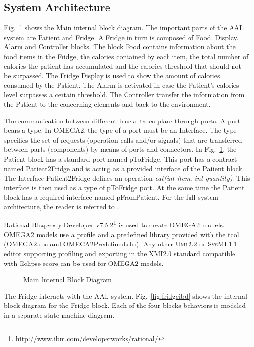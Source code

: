 \documentclass[a4paper,twoside]{article}
\def\sysml{\textsc{SysML}}
\def\uml{\textsc{Uml}}
\begin{document}
\subsection{System Architecture}
Fig.~\ref{fig:mainibd} shows the Main internal block diagram. The important parts of the AAL system are Patient and Fridge. A Fridge in turn is composed of Food, Display, Alarm and Controller blocks. The block Food contains information about the food items in the Fridge, the calories contained by each item, the total number of calories the patient has accumulated and the calories threshold that should not be surpassed. The Fridge Display is used to show the amount of calories consumed by the Patient. The Alarm is activated in case the Patient's calories level surpasses a certain threshold. The Controller transfer the information from the Patient to the concerning elements and back to the environment. 

The communication between different blocks takes place through ports. A  port  bears  a  type.  In  OMEGA2,  the  type  of  a  port  must  be  an  Interface. The type specifies the set of requests (operation calls and/or signals) that  are transferred between parts (components) by means of ports and connectors. In Fig.~\ref{fig:mainibd}, the Patient block has a standard port named pToFridge. This port has a contract named Patient2Fridge and is acting as a provided interface of the Patient block. The Interface Patient2Fridge defines an operation \textit{eat(int item, int quantity)}. This interface is then used as a type of pToFridge port. At the same time the Patient block has a required interface named pFromPatient. For the full system architecture, the reader is referred to \cite{test17}.

Rational Rhapsody Developer v7.5.2\footnote{http://www.ibm.com/developerworks/rational/} is used to create OMEGA2 models. OMEGA2 models use a profile and a predefined library provided with the tool (OMEGA2.sbs and OMEGA2Predefined.sbs). Any other \uml{}2.2 or \sysml{}1.1 editor supporting profiling and exporting in the XMI2.0 standard compatible with Eclipse ecore can be used for OMEGA2 models.

\begin{figure}[!h]
  \centering
  {}
  \caption{Main Internal Block Diagram}
  \label{fig:mainibd}
 \end{figure}
 
The Fridge interacts with the AAL system. Fig.~\ref{fig:fridgeibd} shows the internal block diagram for the Fridge block. Each of the four blocks behaviors is modeled in a separate state machine diagram.
\end{document}
